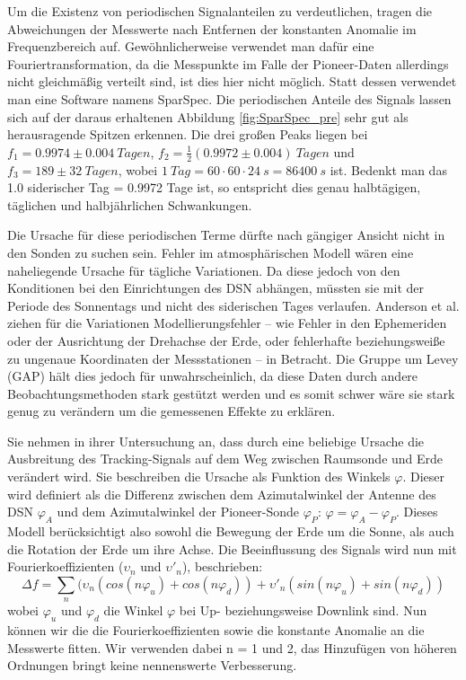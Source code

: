 Um die Existenz von periodischen Signalanteilen zu verdeutlichen, tragen die Abweichungen der Messwerte nach Entfernen der konstanten Anomalie im Frequenzbereich auf. Gewöhnlicherweise verwendet man dafür eine Fouriertransformation, da die Messpunkte im Falle der Pioneer-Daten allerdings nicht gleichmäßig verteilt sind, ist dies hier nicht möglich. Statt dessen verwendet man eine Software namens SparSpec.
Die periodischen Anteile des Signals lassen sich auf der daraus erhaltenen Abbildung \ref{fig:SparSpec_pre} sehr gut als herausragende Spitzen erkennen.
Die drei großen Peaks liegen bei $f_1=0.9974\pm0.004\ Tagen$, $f_2=\frac12(0.9972\pm0.004)\ Tagen$ und 
$f_3=189\pm32\ Tagen$, wobei $ 1\ Tag = 60 \cdot 60 \cdot 24 \:s = 86400\:s$ ist.
Bedenkt man das 1.0 siderischer Tag = 0.9972 Tage ist, so entspricht dies genau halbtägigen, täglichen und halbjährlichen Schwankungen.

Die Ursache für diese periodischen Terme dürfte nach gängiger Ansicht nicht in den Sonden zu suchen sein. Fehler im atmosphärischen Modell wären eine naheliegende Ursache für tägliche Variationen. Da diese jedoch von den Konditionen bei den Einrichtungen des DSN abhängen, müssten sie mit der Periode des Sonnentags und nicht des siderischen Tages verlaufen\cite{Levy2009}.
Anderson et al. ziehen für die Variationen Modellierungsfehler – wie Fehler in den Ephemeriden oder der Ausrichtung der Drehachse der Erde, oder fehlerhafte beziehungsweiße zu ungenaue Koordinaten der Messstationen – in Betracht\cite{Levy2009}\cite{Dittus2006}. %
Die Gruppe um Levey (GAP) hält dies jedoch für unwahrscheinlich, da diese Daten durch andere Beobachtungsmethoden
stark gestützt werden und es somit schwer wäre sie stark genug zu verändern um die gemessenen Effekte zu erklären. %

Sie nehmen in ihrer Untersuchung an, dass durch eine beliebige Ursache die Ausbreitung des Tracking-Signals auf
dem Weg zwischen Raumsonde und Erde verändert wird. Sie beschreiben die Ursache als Funktion des Winkels $\varphi$. Dieser wird definiert als die Differenz zwischen dem Azimutalwinkel der Antenne des DSN $\varphi_A$ und dem Azimutalwinkel der Pioneer-Sonde $\varphi_P$: $\varphi=\varphi_A-\varphi_P$. %
Dieses Modell berücksichtigt also sowohl die Bewegung der Erde um die Sonne, als auch die Rotation der Erde um ihre Achse.
Die Beeinflussung des Signals wird nun mit Fourierkoeffizienten ($\upsilon_n$ und $\upsilon'_n$), beschrieben:
\begin{equation}
\Delta f = \sum_n (\upsilon_n(cos(n\varphi_u)+cos(n\varphi_d))+\upsilon'_n(sin(n\varphi_u)+sin(n\varphi_d))
\end{equation}
wobei $\varphi_u$ und $\varphi_d$ die Winkel $\varphi$ bei Up- beziehungsweise Downlink sind.
Nun können wir die die Fourierkoeffizienten sowie die konstante Anomalie an die Messwerte fitten. Wir verwenden dabei n = 1 und 2, das Hinzufügen von höheren Ordnungen bringt keine nennenswerte Verbesserung.

